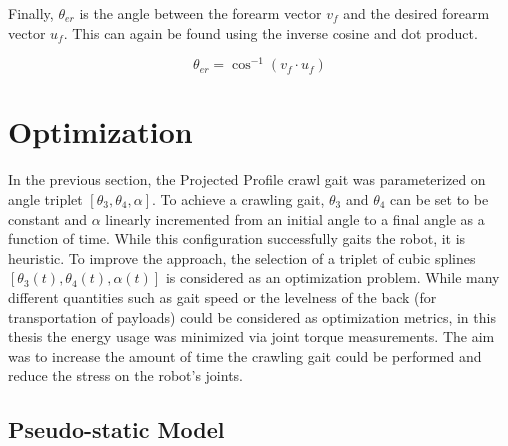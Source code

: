 Finally, $\theta_{er}$ is the angle between the forearm vector $v_f$ and the desired forearm vector $u_f$.
This can again be found using the inverse cosine and dot product.

\begin{equation}
	\theta_{er} = \cos^{-1}(v_{f} \cdot u_{f})
\end{equation}


\section{Optimization} \label{sec:crawl_optimization}

In the previous section, the Projected Profile crawl gait was parameterized on angle triplet 
$[ \theta_3, \theta_4, \alpha ]$.
To achieve a crawling gait, $\theta_3$ and $\theta_4$ can be set to be constant and $\alpha$ linearly incremented
from an initial angle to a final angle as a function of time. While this configuration successfully gaits the robot,
it is heuristic. To improve the approach, the selection of a triplet of cubic splines 
$[\theta_3(t), \theta_4(t), \alpha(t)]$ is considered as an optimization problem. 
While many different quantities such as gait speed or the levelness of the back 
(for transportation of payloads) could be considered as optimization metrics, in this thesis the energy usage was 
minimized via joint torque measurements.
The aim was to increase the amount of time the crawling gait could be performed and reduce the stress on the robot's joints.

\subsection{Pseudo-static Model} \label{subsec:crawl_pseudo_static_model}

